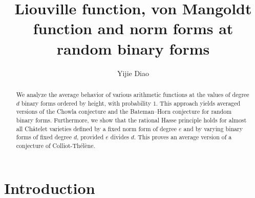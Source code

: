 \documentclass[reqno, 11pt]{amsart}
\theoremstyle{definition}
\theoremstyle{definition}
\numberwithin{equation}{section}
\begin{document}
 


\title[Liouville, von Mangoldt and norm forms at random binary forms]{Liouville function, von Mangoldt function and norm forms at random binary forms}

\author{Yijie Diao}
\address{ISTA\\
Am Campus 1\\
3400 Klosterneuburg\\
Austria}


\begin{abstract}
We analyze the average behavior of various arithmetic functions at the values of degree $d$ binary forms ordered by height, with probability $1$. This approach yields averaged versions of the Chowla conjecture and the Bateman--Horn conjecture for random binary forms. Furthermore, we show that the rational Hasse principle holds for almost all Ch\^atelet varieties defined by a fixed norm form of degree $e$ and by varying binary forms of fixed degree $d$, provided $e$ divides $d$. This proves an average version of a conjecture of Colliot-Th\'el\`ene.

\end{abstract}


\maketitle

\tableofcontents

\section{Introduction}
\end{document}
